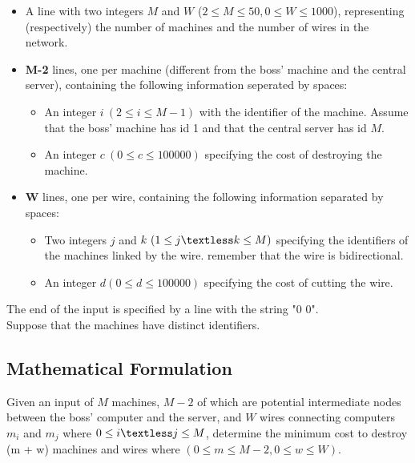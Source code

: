 \documentclass[12pt]{article}
\begin{document}
\begin{itemize}
    \item A line with two integers $M$ and $W$ ($2 \leq M \leq 50, 0 \leq W \leq 1000$), representing
    (respectively) the number of machines and the number of wires in the network.
    \item \textbf{M-2} lines, one per machine (different from the boss' machine and the central
    server), containing the following information seperated by spaces:
    \begin{itemize}
        \item An integer $i\ (2 \leq i \leq M-1)$ with the identifier of the machine. Assume
        that the boss' machine has id 1 and that the central server has id $M$.
        \item An integer $c\ (0 \leq c \leq 100000)$ specifying the cost of destroying the machine.
    \end{itemize}
    \item \textbf{W} lines, one per wire, containing the following information separated by spaces:
    \begin{itemize}
        \item Two integers $j$ and $k\ (1 \leq j \textless k \leq M)$ specifying the identifiers of the machines linked by the wire. remember that the wire is bidirectional.
        \item An integer $d (0 \leq d \leq 100000)$ specifying the cost of cutting the wire.
    \end{itemize}
\end{itemize}
The end of the input is specified by a line with the string "0 0". \\
Suppose that the machines have distinct identifiers.


\newpage

\subsection{Mathematical Formulation}
Given an input of $M$ machines, $M-2$ of which are potential intermediate nodes
between the boss' computer and the server, and $W$ wires connecting computers $m_i$
and $m_j$ where $0 \leq i \textless j \leq M$, determine the minimum cost to destroy (m + w)
machines and wires where $(0 \leq m \leq M-2, 0 \leq w \leq W)$.
\end{document}
